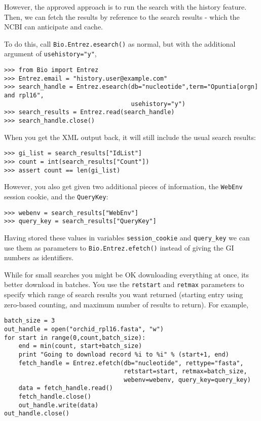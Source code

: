 \documentclass{report}
\begin{document}
However, the approved approach is to run the search with the history
feature.  Then, we can fetch the results by reference to the search
results - which the NCBI can anticipate and cache.

To do this, call \verb|Bio.Entrez.esearch()| as normal, but with the
additional argument of \verb|usehistory="y"|,

\begin{verbatim}
>>> from Bio import Entrez
>>> Entrez.email = "history.user@example.com"
>>> search_handle = Entrez.esearch(db="nucleotide",term="Opuntia[orgn] and rpl16",
                                   usehistory="y")
>>> search_results = Entrez.read(search_handle)
>>> search_handle.close()
\end{verbatim}

\noindent When you get the XML output back, it will still include the usual search results:

\begin{verbatim}
>>> gi_list = search_results["IdList"]
>>> count = int(search_results["Count"])
>>> assert count == len(gi_list)
\end{verbatim}

\noindent However, you also get given two additional pieces of information, the {\tt WebEnv} session cookie, and the {\tt QueryKey}:

\begin{verbatim}
>>> webenv = search_results["WebEnv"]
>>> query_key = search_results["QueryKey"] 
\end{verbatim}

Having stored these values in variables {\tt session\_cookie} and {\tt query\_key} we can use them as parameters to \verb|Bio.Entrez.efetch()| instead of giving the GI numbers as identifiers.  

While for small searches you might be OK downloading everything at once, its better download in batches.  You use the {\tt retstart} and {\tt retmax} parameters to specify which range of search results you want returned (starting entry using zero-based counting, and maximum number of results to return).  For example,

\begin{verbatim}
batch_size = 3
out_handle = open("orchid_rpl16.fasta", "w")
for start in range(0,count,batch_size):
    end = min(count, start+batch_size)
    print "Going to download record %i to %i" % (start+1, end)
    fetch_handle = Entrez.efetch(db="nucleotide", rettype="fasta",
                                 retstart=start, retmax=batch_size,
                                 webenv=webenv, query_key=query_key)
    data = fetch_handle.read()
    fetch_handle.close()
    out_handle.write(data)
out_handle.close()
\end{verbatim}
\end{document}
